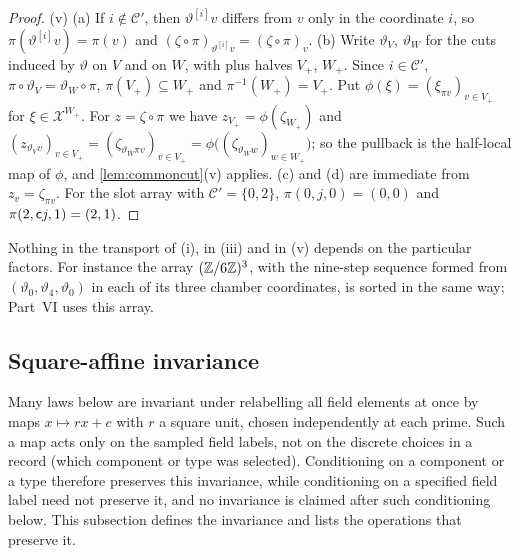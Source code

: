 \begin{proof}
(v) (a) If $i\notin\mathcal C'$, then $\vartheta^{[i]}v$ differs from $v$ only in
the coordinate $i$, so $\pi(\vartheta^{[i]}v)=\pi(v)$ and
$(\zeta\circ\pi)_{\vartheta^{[i]}v}=(\zeta\circ\pi)_v$. (b) Write $\vartheta_V$,
$\vartheta_W$ for the cuts induced by $\vartheta$ on $V$ and on $W$, with plus
halves $V_+$, $W_+$. Since $i\in\mathcal C'$, $\pi\circ\vartheta_V=\vartheta_W\circ\pi$,
$\pi(V_+)\subseteq W_+$ and $\pi^{-1}(W_+)=V_+$. Put
$\phi(\xi)=(\xi_{\pi v})_{v\in V_+}$ for $\xi\in\mathcal X^{W_+}$. For
$z=\zeta\circ\pi$ we have $z_{V_+}=\phi(\zeta_{W_+})$ and
$(z_{\vartheta_Vv})_{v\in V_+}=(\zeta_{\vartheta_W\pi v})_{v\in V_+}
=\phi\big((\zeta_{\vartheta_Ww})_{w\in W_+}\big)$; so the pullback is the
half-local map of $\phi$, and \cref{lem:commoncut}(v) applies. (c) and (d) are
immediate from $z_v=\zeta_{\pi v}$. For the slot array with $\mathcal C'=\{0,2\}$,
$\pi(0,j,0)=(0,0)$ and $\pi(2,\mathsf c j,1)=(2,1)$.
\end{proof}

\begin{remark}\label{rem:slot-array-instances}
Nothing in the transport of (i), in (iii) and in (v) depends on the particular
factors. For instance the
array $(\mathbb Z/6\mathbb Z)^3$, with the nine-step sequence formed from
$(\vartheta_0,\vartheta_4,\vartheta_0)$ in each of its three chamber
coordinates, is sorted in the same way; Part~VI uses this array.
\end{remark}

\subsection{Square-affine invariance}\label{subsec:pos:invariance}

Many laws below are invariant under relabelling all field elements
at once by maps $x\mapsto rx+c$ with $r$ a square unit, chosen
independently at each prime. Such a map acts only on the sampled
field labels, not on the discrete choices in a record (which
component or type was selected). Conditioning on a component or a
type therefore preserves this invariance, while conditioning on a
specified field label need not preserve it, and no invariance is claimed
after such conditioning below. This subsection
defines the invariance and lists the operations that preserve it.

